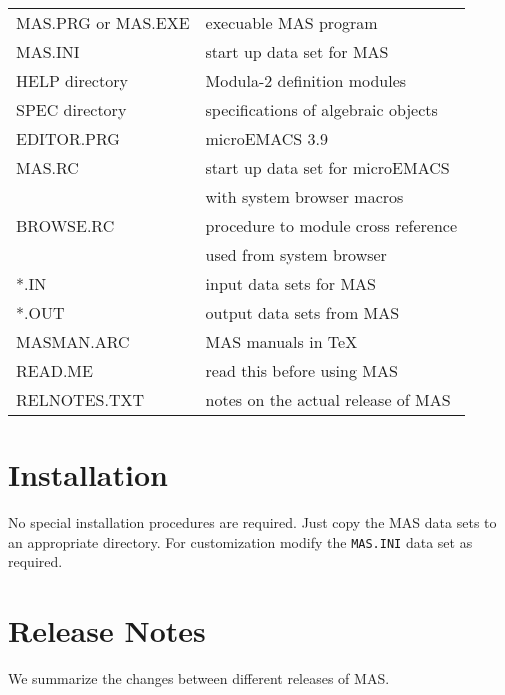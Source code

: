 \begin{center}
\begin{tabular}{ll}
     MAS.PRG or MAS.EXE  & execuable MAS program \\
     MAS.INI             & start up data set for MAS \\
     HELP directory      & Modula-2 definition modules \\
     SPEC directory      & specifications of algebraic objects \\
     EDITOR.PRG          & microEMACS 3.9 \\
     MAS.RC              & start up data set for microEMACS \\
                         & with system browser macros \\
     BROWSE.RC           & procedure to module cross reference \\
                         & used from system browser \\
     *.IN                & input data sets for MAS \\
     *.OUT               & output data sets from MAS \\
     MASMAN.ARC          & MAS manuals in \TeX \\
     READ.ME             & read this before using MAS \\
     RELNOTES.TXT        & notes on the actual release of MAS
\end{tabular}
\end{center}


\section{Installation}

No special installation procedures are required. 
Just copy the MAS data sets to an appropriate directory. 
For customization modify the \verb/MAS.INI/ data set 
as required.

\section{Release Notes}

We summarize the changes between different releases 
of MAS.

